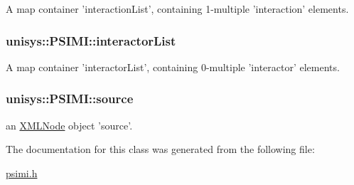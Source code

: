 A map container 'interaction\-List', containing 1-\/multiple 'interaction' elements. 

\hypertarget{classunisys_1_1PSIMI_a5e4a20340555d16d2166fc93a15d0769}{
\subsubsection[{interactor\-List}]{ unisys\-::\-P\-S\-I\-M\-I\-::interactor\-List\hspace{0.3cm}{\ttfamily [private]}}}\label{classunisys_1_1PSIMI_a5e4a20340555d16d2166fc93a15d0769}


A map container 'interactor\-List', containing 0-\/multiple 'interactor' elements. 

\hypertarget{classunisys_1_1PSIMI_a69f3464b518bc0c67ece6a4976d521b6}{
\subsubsection[{source}]{ unisys\-::\-P\-S\-I\-M\-I\-::source\hspace{0.3cm}{\ttfamily [private]}}}\label{classunisys_1_1PSIMI_a69f3464b518bc0c67ece6a4976d521b6}


an \hyperlink{structXMLNode}{X\-M\-L\-Node} object 'source'. 



The documentation for this class was generated from the following file\-:\begin{DoxyCompactItemize}
\item 
\hyperlink{psimi_8h}{psimi.\-h}\end{DoxyCompactItemize}
